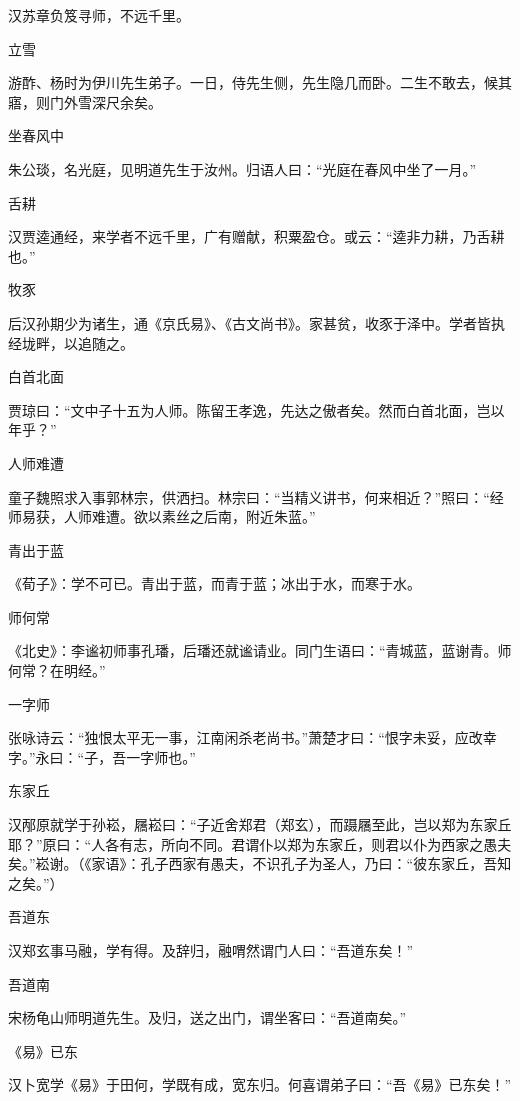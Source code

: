 \documentclass[a4paper,12pt,UTF8,twoside]{ctexbook}
\begin{document}
    汉苏章负笈寻师，不远千里。
    
    立雪
    
    游酢、杨时为伊川先生弟子。一日，侍先生侧，先生隐几而卧。二生不敢去，候其寤，则门外雪深尺余矣。
    
    坐春风中
    
    朱公琰，名光庭，见明道先生于汝州。归语人曰：“光庭在春风中坐了一月。”
    
    舌耕
    
    汉贾逵通经，来学者不远千里，广有赠献，积粟盈仓。或云：“逵非力耕，乃舌耕也。”
    
    牧豕
    
    后汉孙期少为诸生，通《京氏易》、《古文尚书》。家甚贫，收豕于泽中。学者皆执经垅畔，以追随之。
    
    白首北面
    
    贾琼曰：“文中子十五为人师。陈留王孝逸，先达之傲者矣。然而白首北面，岂以年乎？”
    
    人师难遭
    
    童子魏照求入事郭林宗，供洒扫。林宗曰：“当精义讲书，何来相近？”照曰：“经师易获，人师难遭。欲以素丝之后南，附近朱蓝。”
    
    青出于蓝
    
    《荀子》：学不可已。青出于蓝，而青于蓝；冰出于水，而寒于水。
    
    师何常
    
    《北史》：李谧初师事孔璠，后璠还就谧请业。同门生语曰：“青城蓝，蓝谢青。师何常？在明经。”
    
    一字师
    
    张咏诗云：“独恨太平无一事，江南闲杀老尚书。”萧楚才曰：“恨字未妥，应改幸字。”永曰：“子，吾一字师也。”
    
    东家丘
    
    汉邴原就学于孙崧，屩崧曰：“子近舍郑君（郑玄），而蹑屩至此，岂以郑为东家丘耶？”原曰：“人各有志，所向不同。君谓仆以郑为东家丘，则君以仆为西家之愚夫矣。”崧谢。（《家语》：孔子西家有愚夫，不识孔子为圣人，乃曰：“彼东家丘，吾知之矣。”）
    
    吾道东
    
    汉郑玄事马融，学有得。及辞归，融喟然谓门人曰：“吾道东矣！”
    
    吾道南
    
    宋杨龟山师明道先生。及归，送之出门，谓坐客曰：“吾道南矣。”
    
    《易》已东
    
    汉卜宽学《易》于田何，学既有成，宽东归。何喜谓弟子曰：“吾《易》已东矣！”
    
\end{document}
